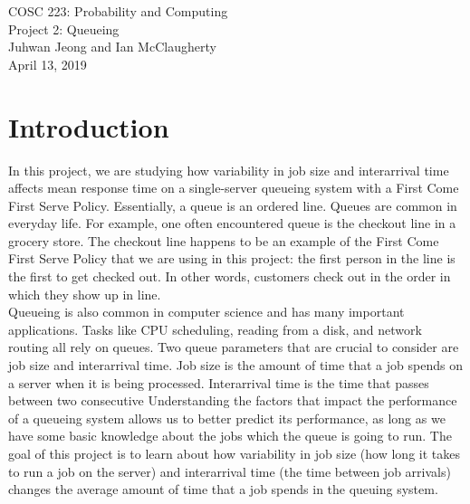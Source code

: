 \documentclass[12pt]{article}
\begin{document}
\begin{center}
\Large{COSC 223: Probability and Computing} \\
\Large{Project 2: Queueing} \\ 
\large{Juhwan Jeong and Ian McClaugherty} \\
\large{April 13, 2019}
\end{center}

\section{Introduction}
In this project, we are studying how variability in job size and interarrival time affects mean response time on a single-server queueing system with a First Come First Serve Policy. Essentially, a queue is an ordered line. Queues are common in everyday life. For example, one often encountered queue is the checkout line in a grocery store. The checkout line happens to be an example of the First Come First Serve Policy that we are using in this project: the first person in the line is the first to get checked out. In other words, customers check out in the order in which they show up in line.  \\ 

Queueing is also common in computer science and has many important applications. Tasks like CPU scheduling, reading from a disk, and network routing all rely on queues. Two queue parameters that are crucial to consider are job size and interarrival time.  Job size is the amount of time that a job spends on a server when it is being processed. Interarrival time is the time that passes between two consecutive Understanding the factors that impact the performance of a queueing system allows us to better predict its performance, as long as we have some basic knowledge about the jobs which the queue is going to run. The goal of this project is to learn about how variability in job size (how long it takes to run a job on the server) and interarrival time (the time between job arrivals) changes the average amount of time that a job spends in the queuing system. 
\end{document}

